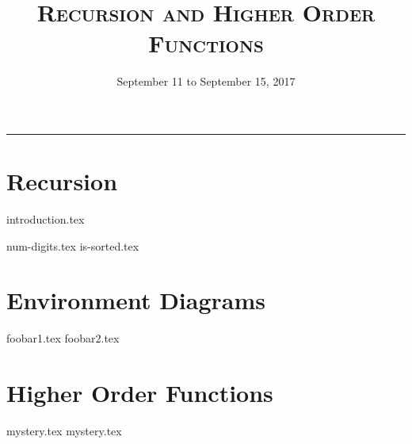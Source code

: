 \documentclass{exam}
\title{\textsc{Recursion and Higher Order Functions}}
\date{September 11 to September 15, 2017}
\begin{document}
\maketitle
\rule{\textwidth}{0.15em}
\fontsize{12}{15}\selectfont


\section{Recursion}
{introduction.tex}
\begin{questions}
{num-digits.tex}
{is-sorted.tex}
\end{questions}

\section{Environment Diagrams}
\begin{questions}
{foobar1.tex}
{foobar2.tex}

\section{Higher Order Functions}
{mystery.tex}
{mystery.tex}
\end{questions}
\end{document}
